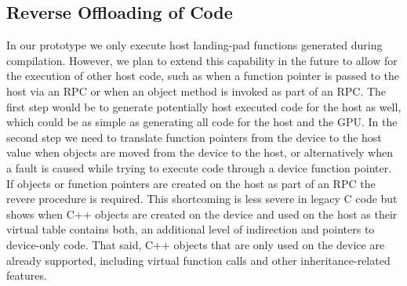 \subsection{Reverse Offloading of Code}

In our prototype we only execute host landing-pad functions generated during compilation.
However, we plan to extend this capability in the future to allow for the execution of other host code, such as when a function pointer is passed to the host via an RPC or when an object method is invoked as part of an RPC.
The first step would be to generate potentially host executed code for the host as well, which could be as simple as generating all code for the host and the GPU.
In the second step we need to translate function pointers from the device to the host value when objects are moved from the device to the host, or alternatively when a fault is caused while trying to execute code through a device function pointer.
If objects or function pointers are created on the host as part of an RPC the revere procedure is required.
This shortcoming is less severe in legacy C code but shows when C++ objects are created on the device and used on the host as their virtual table contains both, an additional level of indirection and pointers to device-only code.
That said, C++ objects that are only used on the device are already supported, including virtual function calls and other inheritance-related features.

